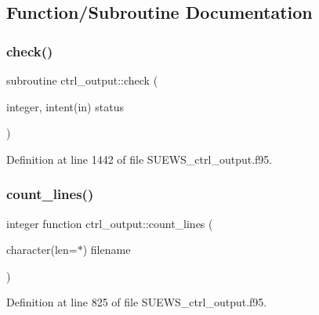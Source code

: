 \subsection{Function/\+Subroutine Documentation}
\mbox{\label{namespacectrl__output_a0fbef481d73d1ca11f59121aadf9cb87}} 
\subsubsection{\texorpdfstring{check()}{check()}}
{\footnotesize\ttfamily subroutine ctrl\+\_\+output\+::check (\begin{DoxyParamCaption}\item[{integer, intent(in)}]{status }\end{DoxyParamCaption})}



Definition at line 1442 of file S\+U\+E\+W\+S\+\_\+ctrl\+\_\+output.\+f95.

\mbox{\label{namespacectrl__output_ad7bc76aa43873e663835c8d008f7d548}} 
\subsubsection{\texorpdfstring{count\+\_\+lines()}{count\_lines()}}
{\footnotesize\ttfamily integer function ctrl\+\_\+output\+::count\+\_\+lines (\begin{DoxyParamCaption}\item[{character(len=$\ast$)}]{filename }\end{DoxyParamCaption})}



Definition at line 825 of file S\+U\+E\+W\+S\+\_\+ctrl\+\_\+output.\+f95.

\mbox{\label{namespacectrl__output_a01d8b0b36afd96d4fe5ff45436e13782}} 
